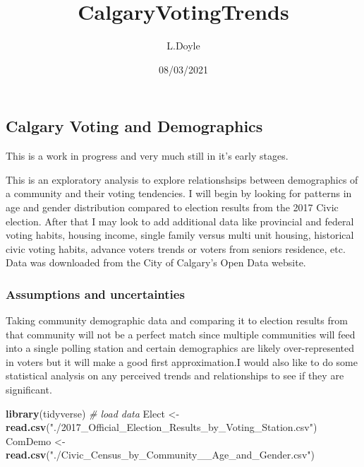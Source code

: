 \documentclass[
]{article}
\title{CalgaryVotingTrends}
\author{L.Doyle}
\date{08/03/2021}
\newenvironment{Shaded}{\begin{snugshade}}{\end{snugshade}}
\newcommand{\CommentTok}[1]{\textcolor[rgb]{0.56,0.35,0.01}{\textit{#1}}}
\newcommand{\KeywordTok}[1]{\textcolor[rgb]{0.13,0.29,0.53}{\textbf{#1}}}
\newcommand{\NormalTok}[1]{#1}
\newcommand{\StringTok}[1]{\textcolor[rgb]{0.31,0.60,0.02}{#1}}
\begin{document}
\maketitle

\hypertarget{calgary-voting-and-demographics}{%
\subsection{Calgary Voting and
Demographics}\label{calgary-voting-and-demographics}}

This is a work in progress and very much still in it's early stages.

This is an exploratory analysis to explore relationshsips between
demographics of a community and their voting tendencies. I will begin by
looking for patterns in age and gender distribution compared to election
results from the 2017 Civic election. After that I may look to add
additional data like provincial and federal voting habits, housing
income, single family versus multi unit housing, historical civic voting
habits, advance voters trends or voters from seniors residence, etc.
Data was downloaded from the City of Calgary's Open Data website.

\hypertarget{assumptions-and-uncertainties}{%
\subsubsection{Assumptions and
uncertainties}\label{assumptions-and-uncertainties}}

Taking community demographic data and comparing it to election results
from that community will not be a perfect match since multiple
communities will feed into a single polling station and certain
demographics are likely over-represented in voters but it will make a
good first approximation.I would also like to do some statistical
analysis on any perceived trends and relationships to see if they are
significant.

\begin{Shaded}
\begin{Highlighting}[]
\KeywordTok{library}\NormalTok{(tidyverse)}
\CommentTok{# load data}
\NormalTok{Elect <-}\StringTok{ }\KeywordTok{read.csv}\NormalTok{(}\StringTok{"./2017_Official_Election_Results_by_Voting_Station.csv"}\NormalTok{)}
\NormalTok{ComDemo <-}\StringTok{ }\KeywordTok{read.csv}\NormalTok{(}\StringTok{"./Civic_Census_by_Community__Age_and_Gender.csv"}\NormalTok{)}
\end{Highlighting}
\end{Shaded}
\end{document}
